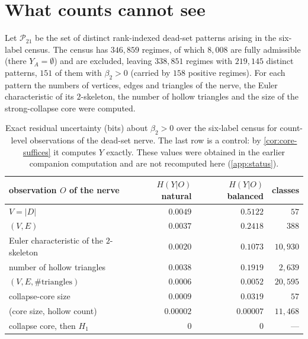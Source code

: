 \section{What counts cannot see}\label{sec:D21}
Let $\mathcal P_{21}$ be the set of distinct rank-indexed dead-set patterns arising in the six-label census. The census has $346{,}859$ regimes, of which $8{,}008$ are fully admissible (there $Y_A=\emptyset$) and are excluded, leaving $338{,}851$ regimes with $219{,}145$ distinct patterns, $151$ of them with $\beta_2>0$ (carried by $158$ positive regimes). For each pattern the numbers of vertices, edges and triangles of the nerve, the Euler characteristic of its $2$-skeleton, the number of hollow triangles and the size of the strong-collapse core were computed.
\begin{table}[ht]\centering\small
\begin{tabular}{@{}lrrr@{}}\toprule
observation $O$ of the nerve & $H(Y|O)$ natural & $H(Y|O)$ balanced & classes\\ \midrule
$V=|D|$ & $0.0049$ & $0.5122$ & $57$\\
$(V,E)$ & $0.0037$ & $0.2418$ & $388$\\
Euler characteristic of the $2$-skeleton & $0.0020$ & $0.1073$ & $10{,}930$\\
number of hollow triangles & $0.0038$ & $0.1919$ & $2{,}639$\\
$(V,E,\#\text{triangles})$ & $0.0006$ & $0.0052$ & $20{,}595$\\
collapse-core size & $0.0009$ & $0.0319$ & $57$\\
(core size, hollow count) & $0.00002$ & $0.00007$ & $11{,}468$\\
collapse core, then $H_1$ & $0$ & $0$ & ---\\ \bottomrule
\end{tabular}
\caption{Exact residual uncertainty (bits) about $\beta_2>0$ over the six-label census for count-level observations of the dead-set nerve. The last row is a control: by \cref{cor:core-suffices} it computes $Y$ exactly. These values were obtained in the earlier companion computation and are not recomputed here (\cref{app:status}).}\label{tab:D21}
\end{table}
